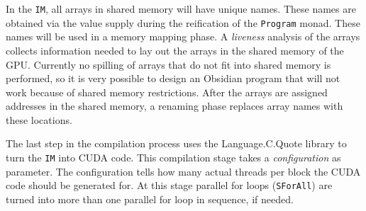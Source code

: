 



In the {\tt IM}, all arrays in shared memory will have unique 
names. These names are obtained via the value supply during the reification 
of the {\tt Program} monad. These names will be used in a memory mapping phase.
A {\em liveness} analysis of the arrays collects information needed to lay 
out the arrays in the shared memory of the GPU. Currently no spilling of 
arrays that do not fit into shared memory is performed, so it is very possible 
to design an Obsidian program that will not work because of shared memory 
restrictions. After the arrays are assigned addresses in the shared memory,
a renaming phase replaces array names with these locations. 

The last step in the compilation process uses the Language.C.Quote library to 
turn the {\tt IM} into CUDA code. This compilation stage takes a {\em configuration} 
as parameter. The configuration tells how many actual threads per block the 
CUDA code should be generated for. At this stage parallel for loops ({\tt SForAll})
are turned into more than one parallel for loop in sequence, if needed. 



